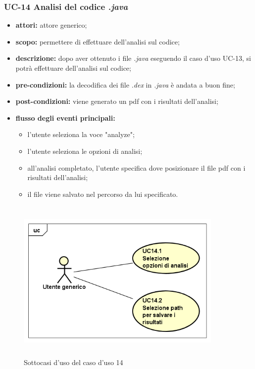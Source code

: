 \subsubsection{UC-14 Analisi del codice \textit{.java}}\label{subsubsec:uc-14-analisi-del-codicetextit}
\begin{itemize}
    \item \textbf{attori:} attore generico;
    \item \textbf{scopo:} permettere di effettuare dell'analisi sul codice;
    \item \textbf{descrizione:} dopo aver ottenuto i file \textit{.java} eseguendo il caso d'uso UC-13, si potr\`{a} effettuare dell'analisi sul codice;
    \item \textbf{pre-condizioni:} la decodifica dei file \textit{.dex} in \textit{.java} \`{e} andata a buon fine;
    \item \textbf{post-condizioni:} viene generato un pdf con i risultati dell'analisi;
    \item \textbf{flusso degli eventi principali:}
    \begin{itemize}
        \item l'utente seleziona la voce "analyze";
        \item l'utente seleziona le opzioni di analisi;
        \item all'analisi completato, l'utente specifica dove posizionare il file pdf con i risultati dell'analisi;
        \item il file viene salvato nel percorso da lui specificato.
    \end{itemize}
\end{itemize}
\begin{figure}[!h]
    \centering
    \includegraphics[width=10cm, height=8cm]{./immagini/usecase/uc_14_1_14_2.png}
    \caption{Sottocasi d'uso del caso d'uso 14}
\end{figure}


